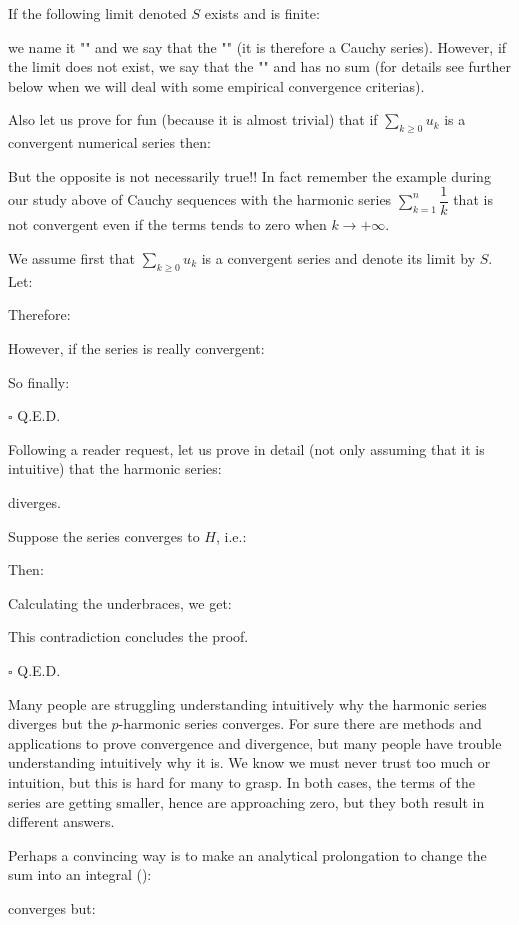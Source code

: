 	If the following limit denoted $S$ exists and is finite:
	
	we name it "" and we say that the "" (it is therefore a  Cauchy series). However, if the limit does not exist, we say that the "" and has no sum (for details see further below when we will deal with some empirical convergence criterias).
	\begin{theorem}
		Also let us prove for fun (because it is almost trivial) that if $\displaystyle \sum_{k\geq 0} u_k $ is a convergent numerical series then:
		
		But the opposite is not necessarily true!! In fact remember the example during our study above of Cauchy sequences with the harmonic series $\sum_{k=1}^n \dfrac{1}{k}$ that is not convergent even if the terms tends to zero when $k \rightarrow +\infty$.
	\end{theorem}
	\begin{dem}
		We assume first that $\displaystyle \sum_{k\geq 0} u_k $ is a convergent series and denote its limit by $S$. Let:
		
		Therefore:
		
		However, if the series is really convergent:
		
		So finally:
		
		\begin{flushright}
			$\square$  Q.E.D.
		\end{flushright}
	\end{dem}
	Following a reader request, let us prove in detail (not only assuming that it is intuitive) that the harmonic series\label{harmonic series}:
	
	diverges.
	\begin{dem}
		Suppose the series converges to $H$, i.e.:
		
		Then:
		
		Calculating the underbraces, we get:
		
		This contradiction concludes the proof.	
		\begin{flushright}
			$\square$  Q.E.D.
		\end{flushright}
	\end{dem}
	\begin{tcolorbox}[title=Remark,colframe=black,arc=10pt]
	Many people are struggling understanding intuitively why the harmonic series diverges but the $p$-harmonic series converges. For sure there are methods and applications to prove convergence and divergence, but many people have trouble understanding intuitively why it is. We know we must never trust too much or intuition, but this is hard for many to grasp. In both cases, the terms of the series are getting smaller, hence are approaching zero, but they both result in different answers.
	
	Perhaps a convincing way is to make an analytical prolongation to change the sum into an integral ():
	
	converges but:
	
	\end{tcolorbox}
	
